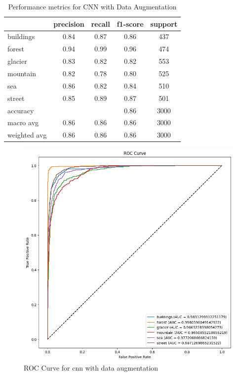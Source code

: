 \documentclass[conference]{IEEEtran}
\begin{document}
\begin{table}[H]
\centering
\begin{tabular}{lcccc}
\toprule
\textbf{} & \textbf{precision} & \textbf{recall} & \textbf{f1-score} & \textbf{support} \\
\midrule
buildings & 0.84 & 0.87 & 0.86 & 437 \\
forest & 0.94 & 0.99 & 0.96 & 474 \\
glacier & 0.83 & 0.82 & 0.82 & 553 \\
mountain & 0.82 & 0.78 & 0.80 & 525 \\
sea & 0.86 & 0.82 & 0.84 & 510 \\
street & 0.85 & 0.89 & 0.87 & 501 \\
\midrule
accuracy & & & 0.86 & 3000 \\
macro avg & 0.86 & 0.86 & 0.86 & 3000 \\
weighted avg & 0.86 & 0.86 & 0.86 & 3000 \\
\bottomrule
\end{tabular}
\caption{Performance metrics for CNN with Data Augmentation}
\end{table}

\begin{figure}[H]
    \centering
    \includegraphics[width=1\linewidth]{images//CNN/ROC_CNN_Augmented.png}
    \caption{ROC Curve for cnn with data augmentation}
    \label{fig:ROC_CNN_Augmented}
\end{figure}
\end{document}
